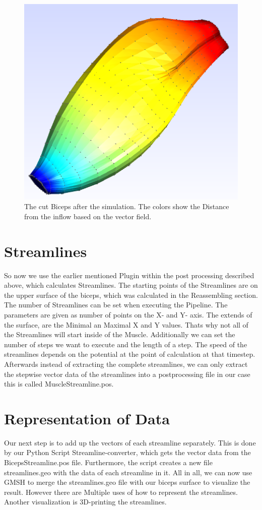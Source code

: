 \documentclass[preprint,journal]{vgtc}       %
\begin{document}
\begin{figure}
	\begin{center}
		\includegraphics[width=.7\linewidth]{Sim.png}
	\end{center}
	\caption{The cut Biceps after the simulation. The colors show the Distance from the inflow based on the vector field.}
	\label{fig:sim}
\end{figure}
\section{Streamlines}
So now we use the earlier mentioned Plugin within the post processing described above, which calculates Streamlines. The starting points of the Streamlines are on the upper surface of the biceps, which was calculated in the Reassembling section. The number of Streamlines can be set when executing the Pipeline. The parameters are given as number of points on the X- and Y- axis. The extends of the surface, are the Minimal an Maximal X and Y values. Thats why not all of the Streamlines will start inside of the Muscle. Additionally we can set the number of steps we want to execute  and the length of a step. The speed of the streamlines depends on the potential at the point of calculation at that timestep.  Afterwards instead of extracting the complete streamlines, we can only extract the stepwise vector data of the streamlines into a postprocessing file in our case this is called MuscleStreamline.pos.

\section{Representation of Data}
Our next step is to add up the vectors of each streamline separately. This is done by our Python Script Streamline-converter, which gets the vector data from the BicepsStreamline.pos file. Furthermore, the script creates a new file streamlines.geo with the data of each streamline in it. All in all, we can now use GMSH to merge the streamlines.geo file with our biceps surface to visualize the result. However there are Multiple uses of how to represent the streamlines. Another visualization is 3D-printing the streamlines.
\end{document}
